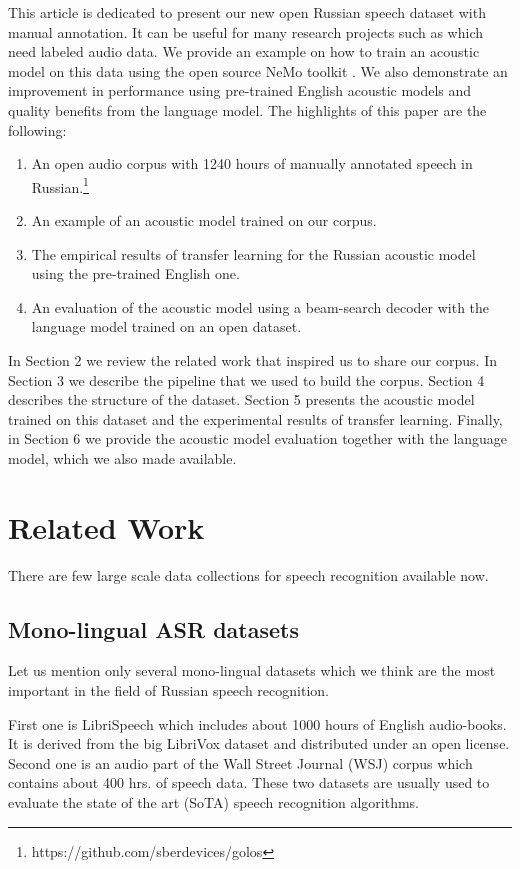 \documentclass[a4paper]{article}
\begin{document}
This article is dedicated to present our new open Russian speech dataset with manual annotation. It can be useful for many research projects such as \cite{savchenko2008analyse, gubochkin2013cl} which need labeled audio data. We provide an example on how to train an acoustic model on this data using the open source NeMo toolkit \cite{kuchaiev2019nemo}. We also demonstrate an improvement in performance using pre-trained English acoustic models and quality benefits from the language model. The highlights of this paper are the following:
\begin{enumerate}
\item An open audio corpus with 1240 hours of manually annotated speech in Russian.\footnote{https://github.com/sberdevices/golos}
\item An example of an acoustic model trained on our corpus.
\item The empirical results of transfer learning for the Russian acoustic model using the pre-trained English one.
\item An evaluation of the acoustic model using a beam-search decoder with the language model trained on an open dataset.
\end{enumerate}


In Section 2 we review the related work that inspired us to share our corpus. In Section 3 we describe the pipeline that we used to build the corpus. Section 4 describes the structure of the dataset. Section 5 presents the acoustic model trained on this dataset and the experimental results of transfer learning. Finally, in Section 6 we provide the acoustic model evaluation together with the language model, which we also made available.

\section{Related Work}

There are few large scale data collections for speech recognition available now. 

\subsection{Mono-lingual ASR datasets}

Let us mention only several mono-lingual datasets which we think are the most important in the field of Russian speech recognition.

First one is LibriSpeech \cite{panayotov2015librispeech} which includes about 1000 hours of English audio-books. It is derived from the big LibriVox dataset and distributed under an open license. Second one is an audio part of the Wall Street Journal (WSJ) corpus \cite{paul1992design} which contains about 400 hrs. of speech data. These two datasets are usually used to evaluate the state of the art (SoTA) speech recognition algorithms.
\end{document}
